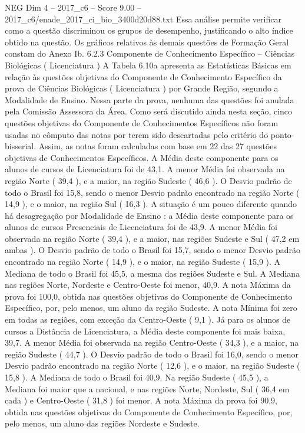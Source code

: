 \begin{textsample}{NEG Dim 4 – 2017\_c6 – Score 9.00 – 2017\_c6/enade\_2017\_ci\_bio\_3400d20d88.txt}
Essa análise permite verificar como a questão discriminou os grupos de desempenho, justificando o alto índice obtido na questão.
Os gráficos relativos às demais questões de Formação Geral constam do Anexo Ib. 6.2.3 Componente de Conhecimento Específico – Ciências Biológicas ( Licenciatura ) A Tabela 6.10a apresenta as Estatísticas Básicas em relação às questões objetivas do Componente de Conhecimento Específico da prova de Ciências Biológicas ( Licenciatura ) por Grande Região, segundo a Modalidade de Ensino.
Nessa parte da prova, nenhuma das questões foi anulada pela Comissão Assessora da Área.
Como será discutido ainda nesta seção, cinco questões objetivas do Componente de Conhecimentos Específicos não foram usadas no cômputo das notas por terem sido descartadas pelo critério do ponto-bisserial.
Assim, as notas foram calculadas com base em 22 das 27 questões objetivas de Conhecimentos Específicos.
A Média deste componente para os alunos de cursos de Licenciatura foi de 43,1.
A menor Média foi observada na região Norte ( 39,4 ), e a maior, na região Sudeste ( 46,6 ).
O Desvio padrão de todo o Brasil foi 15,8, sendo o menor Desvio padrão encontrado na região Norte ( 14,9 ), e o maior, na região Sul ( 16,3 ).
A situação é um pouco diferente quando há desagregação por Modalidade de Ensino : a Média deste componente para os alunos de cursos Presenciais de Licenciatura foi de 43,9.
A menor Média foi observada na região Norte ( 39,4 ), e a maior, nas regiões Sudeste e Sul ( 47,2 em ambas ).
O Desvio padrão de todo o Brasil foi 15,7, sendo o menor Desvio padrão encontrado na região Norte ( 14,9 ), e o maior, na região Sudeste ( 15,9 ).
A Mediana de todo o Brasil foi 45,5, a mesma das regiões Sudeste e Sul.
A Mediana nas regiões Norte, Nordeste e Centro-Oeste foi menor, 40,9.
A nota Máxima da prova foi 100,0, obtida nas questões objetivas do Componente de Conhecimento Específico, por, pelo menos, um aluno da região Sudeste.
A nota Mínima foi zero em todas as regiões, com exceção da Centro-Oeste ( 9,1 ).
Já para os alunos de cursos a Distância de Licenciatura, a Média deste componente foi mais baixa, 39,7.
A menor Média foi observada na região Centro-Oeste ( 34,3 ), e a maior, na região Sudeste ( 44,7 ).
O Desvio padrão de todo o Brasil foi 16,0, sendo o menor Desvio padrão encontrado na região Norte ( 12,6 ), e o maior, na região Sudeste ( 15,8 ).
A Mediana de todo o Brasil foi 40,9.
Na região Sudeste ( 45,5 ), a Mediana foi maior que a nacional, e nas regiões Norte, Nordeste, Sul ( 36,4 em cada ) e Centro-Oeste ( 31,8 ) foi menor.
A nota Máxima da prova foi 90,9, obtida nas questões objetivas do Componente de Conhecimento Específico, por, pelo menos, um aluno das regiões Nordeste e Sudeste.

\end{textsample}
